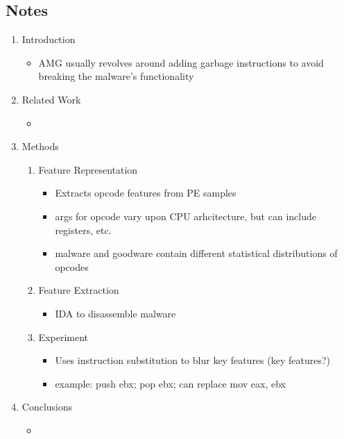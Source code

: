\documentclass{article}
\begin{document}
\subsection*{Notes}

\begin{enumerate}
	\item Introduction
	\begin{itemize}
		\item AMG usually revolves around adding garbage instructions to avoid breaking the malware's functionality
	\end{itemize}
	\item Related Work
	\begin{itemize}
		\item 
	\end{itemize}
	\item Methods
	\begin{enumerate}
		\item Feature Representation
		\begin{itemize}
			\item Extracts opcode features from PE samples
			\item args for opcode vary upon CPU arhcitecture, but can include registers, etc.
			\item malware and goodware contain different statistical distributions of opcodes
		\end{itemize}
		\item Feature Extraction
		\begin{itemize}
			\item IDA to disassemble malware
		\end{itemize}
		\item Experiment
		\begin{itemize}
			\item Uses instruction substitution to blur key features (key features?)
			\item example: push ebx; pop ebx; can replace mov eax, ebx
		\end{itemize}
	\end{enumerate}
	\item Conclusions
	\begin{itemize}
		\item 
	\end{itemize}
\end{enumerate}

\pagebreak

\end{document}
